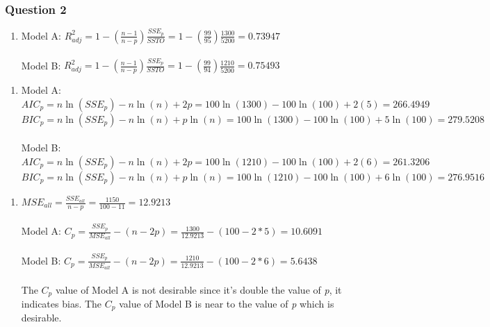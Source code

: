 \documentclass{article}
\providecommand{\tightlist}{%
      \setlength{\itemsep}{0pt}\setlength{\parskip}{0pt}}
\begin{document}
    \subsubsection{Question 2}\label{question-2}

\begin{enumerate}
\def\labelenumi{\alph{enumi})}
\tightlist
\item
  Model A:
  \(R_{adj}^2 = 1 - \left(\frac{n-1}{n-p}\right)\frac{SSE_p}{SSTO} = 1 - \left(\frac{99}{95}\right)\frac{1300}{5200} = 0.73947\) \\
\\
  Model B:
\(R_{adj}^2 = 1 - \left(\frac{n-1}{n-p}\right)\frac{SSE_p}{SSTO} = 1 - \left(\frac{99}{94}\right)\frac{1210}{5200} = 0.75493\)
\end{enumerate}

\begin{enumerate}
\def\labelenumi{\alph{enumi})}
\setcounter{enumi}{1}
\tightlist
\item
  Model A: \\
  \(AIC_p = n\ln(SSE_p) - n\ln(n) + 2p = 100\ln(1300) - 100\ln(100) + 2(5) = 266.4949\) \\
  \(BIC_p = n\ln(SSE_p) - n\ln(n) + p\ln(n) = 100\ln(1300) - 100\ln(100) + 5\ln(100) = 279.5208\) \\
  \\
  Model B: \\
  \(AIC_p = n\ln(SSE_p) - n\ln(n) + 2p = 100\ln(1210) - 100\ln(100) + 2(6) = 261.3206\) \\
  \(BIC_p = n\ln(SSE_p) - n\ln(n) + p\ln(n) = 100\ln(1210) - 100\ln(100) + 6\ln(100) = 276.9516\)
  
\end{enumerate}

\begin{enumerate}
\def\labelenumi{\alph{enumi})}
\setcounter{enumi}{2}
\tightlist
\item
  \(MSE_{all} = \frac{SSE_{all}}{n - p} = \frac{1150}{100-11} = 12.9213\)\\
  \\
  Model A:
  \(C_p = \frac{SSE_p}{MSE_{all}} - (n - 2p) = \frac{1300}{12.9213} - (100 - 2*5) = 10.6091\)\\
\\
  Model B:
  \(C_p = \frac{SSE_p}{MSE_{all}} - (n - 2p) = \frac{1210}{12.9213} - (100 - 2*6) = 5.6438\)\\
\\
The \(C_p\) value of Model A is not desirable since it's double the
value of \emph{p}, it indicates bias. The \(C_p\) value of Model B is
near to the value of \emph{p} which is desirable.
\end{enumerate}
\end{document}
